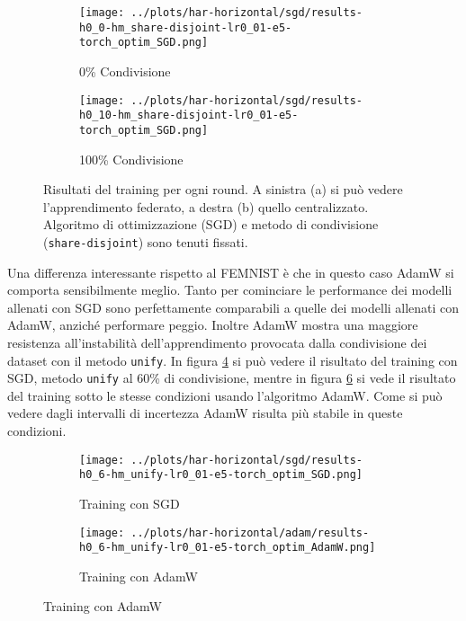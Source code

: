 \begin{figure}[htp]  %
    \centering
    \begin{subfigure}[b]{0.49\textwidth}
        \centering
        \texttt{[image: ../plots/har-horizontal/sgd/results-h0\_0-hm\_share-disjoint-lr0\_01-e5-torch\_optim\_SGD.png]}
        \caption{0\% Condivisione}
        \label{fig:hars0sgd}
    \end{subfigure}
    \hfill
    \begin{subfigure}[b]{0.49\textwidth}
        \centering
        \texttt{[image: ../plots/har-horizontal/sgd/results-h0\_10-hm\_share-disjoint-lr0\_01-e5-torch\_optim\_SGD.png]}
        \caption{100\% Condivisione}
        \label{fig:hars9sgd}
    \end{subfigure}
    
    \caption{
        Risultati del training per ogni round. A sinistra (a) si può 
        vedere l'apprendimento federato, a destra (b) quello centralizzato.
        Algoritmo di ottimizzazione (SGD) e metodo di condivisione 
        (\texttt{share-disjoint}) sono tenuti fissati.
    }
\end{figure}


Una differenza interessante rispetto al FEMNIST è che in questo 
caso AdamW si comporta sensibilmente meglio. Tanto per cominciare
le performance dei modelli allenati con SGD sono perfettamente 
comparabili a quelle dei modelli allenati con AdamW, anziché 
performare peggio. Inoltre AdamW mostra una maggiore resistenza 
all'instabilità dell'apprendimento provocata dalla condivisione 
dei dataset con il metodo \texttt{unify}. In figura 
\ref{fig:haru6sgd} si può vedere il risultato del training con SGD,
metodo \texttt{unify} al 60\% di condivisione, mentre in figura 
\ref{fig:haru6adam} si vede il risultato del training sotto le 
stesse condizioni usando l'algoritmo AdamW. Come si può vedere 
dagli intervalli di incertezza AdamW risulta più stabile in 
queste condizioni.
\begin{figure}[htp]  %
    \centering
    \begin{subfigure}[b]{0.49\textwidth}
        \centering
        \texttt{[image: ../plots/har-horizontal/sgd/results-h0\_6-hm\_unify-lr0\_01-e5-torch\_optim\_SGD.png]}
        \caption{Training con SGD}
        \label{fig:haru6sgd}
    \end{subfigure}
    \hfill
    \begin{subfigure}[b]{0.49\textwidth}
        \centering
        \texttt{[image: ../plots/har-horizontal/adam/results-h0\_6-hm\_unify-lr0\_01-e5-torch\_optim\_AdamW.png]}
        \caption{Training con AdamW}
        \label{fig:haru6adam}
    \end{subfigure}
\end{figure}

